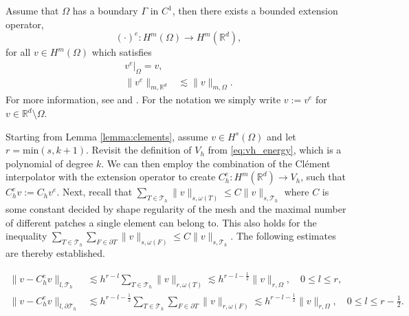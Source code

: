 \documentclass[11pt]{article}
\theoremstyle{remark}
\renewcommand{\le}{\leqslant}
\numberwithin{equation}{section}
\begin{document}
Assume that $\Omega $ has a boundary $\Gamma $ in $C^{1}$, then there exists a bounded extension operator,
\begin{equation}
    ( \cdot ) ^{e}: H^{m}( \Omega )  \to H^{m} ( \mathbb{R} ^{d}),
\end{equation}
for all  $v \in H^{m}( \Omega )$ which satisfies
\begin{equation}
    \begin{split}
 v^{e}| _{\Omega } =   v,  \\
\| v^{e} \|_{ m,\mathbb{R} ^{d}  }^{  } & \lesssim \| v \|_{ m, \Omega  }^{  }.
    \end{split}
\end{equation}
For more information, see \cite[Theorem 9.7]{brezis2011functional} and \cite[p.181, p.185]{stein1970singular}. For the notation we simply write $ v := v^{e}   $ for $v \in \mathbb{R} ^{d} \setminus \Omega $.


Starting from Lemma \ref{lemma:clements}, assume $v \in H^{s}( \Omega ) $ and let $r = \mathrm{min}(s , k+1) $. Revisit the definition of $V_{h}$ from \eqref{eq:vh_energy}, which is a polynomial of degree $k$. We can then employ the combination of the Clément interpolator with the extension operator to create $C_{h}^{e}: H^{m}( \mathbb{R} ^{d}) \to V_{h}$, such that $C ^{e} _{h} v := C _{h} v^{e}$.
 Next, recall that $ \sum_{T\in \mathcal{T}_{h}}^{} \| v \|_{s,\omega ( T)   }^{  } \le C  \| v \|_{s, \mathcal{T}_{h}   }^{  } $ where $C$ is some constant decided by shape regularity of the mesh and the maximal number of different patches a single element can
 belong to. This also holds for the inequality $ \sum_{T \in \mathcal{T}_{h} }^{} \sum_{F \in \partial T}^{}  \| v \|_{s,\omega ( F)   }^{  } \le C  \| v \|_{s, \mathcal{T}_{h}   }^{  } $.
The following estimates are thereby established.

\begin{align}
    \label{eq:bi_projection_estimates_1}
    \| v - C _{h}^{e} v \|_{  l, \mathcal{T} _{h} }^{  } & \lesssim h^{r-l}\sum_{T \in \mathcal{T}_h} \| v \|_{ r, \omega(T) }^{  } \lesssim  h^{r-l-\frac{1}{2}}  \| v \|_{ r, \Omega  }^{  }, \quad 0\le l\le r, \\
    \label{eq:bi_projection_estimates_2}
\| v - C ^{e}_{h}v \|_{ l, \partial \mathcal{T} _{h} }^{  } & \lesssim h^{r-l-\frac{1}{2}}\sum_{T \in \mathcal{T}_h} \sum_{F \in \partial T} \| v \|_{ r, \omega(F)  }^{  } \lesssim h^{r-l-\frac{1}{2}} \| v \|_{ r, \Omega   }^{  }, \quad 0  \le  l \le   r-\frac{1}{2}.
\end{align}
\end{document}
